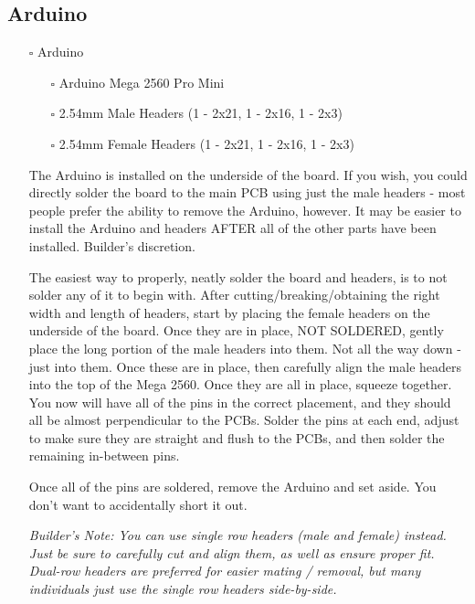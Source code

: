 \documentclass[11pt]{article}
\begin{document}
\subsection{Arduino}
\label{sec:org8543ede}
\begin{itemize}
\item[{$\square$}] Arduino
\begin{itemize}
\item[{$\square$}] Arduino Mega 2560 Pro Mini
\item[{$\square$}] 2.54mm Male Headers (1 - 2x21, 1 - 2x16, 1 - 2x3)
\item[{$\square$}] 2.54mm Female Headers (1 - 2x21, 1 - 2x16, 1 - 2x3)
\end{itemize}

The Arduino is installed on the underside of the board.  If you wish, you could directly solder the board to the main PCB using just the male headers - most people prefer the ability to remove the Arduino, however.  It may be easier to install the Arduino and headers AFTER all of the other parts have been installed.  Builder's discretion.

The easiest way to properly, neatly solder the board and headers, is to not solder any of it to begin with.  After cutting/breaking/obtaining the right width and length of headers, start by placing the female headers on the underside of the board.  Once they are in place, NOT SOLDERED, gently place the long portion of the male headers into them.  Not all the way down - just into them.  Once these are in place, then carefully align the male headers into the top of the Mega 2560.  Once they are all in place, squeeze together.  You now will have all of the pins in the correct placement, and they should all be almost perpendicular to the PCBs.  Solder the pins at each end, adjust to make sure they are straight and flush to the PCBs, and then solder the remaining in-between pins.

Once all of the pins are soldered, remove the Arduino and set aside.  You don't want to accidentally short it out.  

\emph{Builder's Note:  You can use single row headers (male and female) instead.  Just be sure to carefully cut and align them, as well as ensure proper fit.  Dual-row headers are preferred for easier mating / removal, but many individuals just use the single row headers side-by-side.}
\end{itemize}
\end{document}
